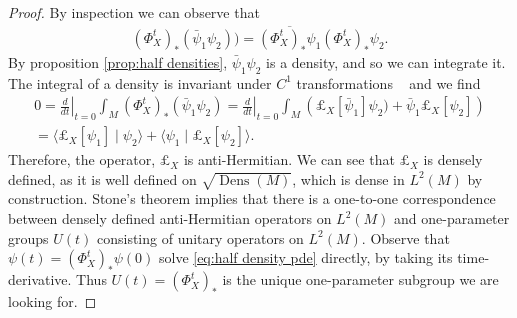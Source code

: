\documentclass[final,leqno]{siamart}
\DeclareMathOperator{\Dens}{Dens}
\begin{document}
\begin{proof}
	By inspection we can observe that
	\begin{align*}
		 (\Phi_{X}^{t})_{*} ( \bar{\psi}_{1} \psi_{2}) ) = \overline{ (\Phi_{X}^{t})_{*} \psi_{1} } (\Phi_{X}^{t})_{*} \psi_{2}.
	\end{align*}
	By proposition \ref{prop:half densities}, $\bar{\psi}_{1} \psi_{2}$ is a density, and so we can integrate it.
	The integral of a density is invariant under $C^{1}$ transformations ~\cite[Proposition 16.42]{Lee2006} and we find
	\begin{align*}
		0 = \left. \frac{d}{dt} \right|_{t=0} \int_{M} (\Phi_{X}^{t})_{*} (\bar{\psi}_{1} \psi_{2}) = \left. \frac{d}{dt} \right|_{t=0} \int_{M} \left( \pounds_{X}[\bar{\psi}_{1} ] \psi_{2})  + \bar{\psi}_{1} \pounds_{X}[\psi_{2}] \right) \\
		= \langle \pounds_{X}[\psi_{1}]  \mid \psi_{2} \rangle + \langle \psi_{1} \mid \pounds_{X}[\psi_{2}] \rangle.
	\end{align*}
	Therefore, the operator, $\pounds_{X}$ is anti-Hermitian.
	We can see that $\pounds_{X}$ is densely defined, as it is well defined on $\sqrt{\Dens(M)}$, which is dense in $L^{2}(M)$ by construction.
	Stone's theorem implies that there is a one-to-one correspondence between densely defined anti-Hermitian operators on $L^{2}(M)$
	and one-parameter groups $U(t)$ consisting of unitary operators on $L^{2}(M)$.
	Observe that $\psi(t) = (\Phi_{X}^{t})_{*} \psi(0)$ solve \eqref{eq:half density pde} directly, by taking its time-derivative.
	Thus $U(t) =  (\Phi_{X}^{t})_{*} $ is the unique one-parameter subgroup we are looking for.
\end{proof}
\end{document}

